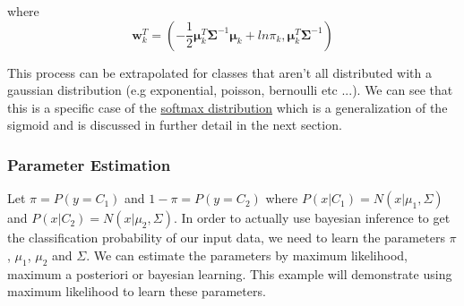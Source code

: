 \documentclass[12pt]{article}
\begin{document}
        where
        $$ \boldsymbol{w}^T_k = (-\frac{1}{2}\boldsymbol{\mu}^T_k \boldsymbol{\Sigma}^{-1} \boldsymbol{\mu}_k + ln\pi_k, \boldsymbol{\mu}_k^T\boldsymbol{\Sigma}^{-1}) $$

        This process can be extrapolated for classes that aren't all distributed with a gaussian distribution (e.g exponential, poisson, bernoulli etc ...). We can see that this is a specific case of the \hyperlink{Softmax Regression}{softmax distribution} which is a generalization of the sigmoid 
        and is discussed in further detail in the next section.

        \subsubsection{Parameter Estimation}
            Let $\pi = P(y = C_1)$ and $1 - \pi=P(y = C_2)$ where $P(x|C_1)=N(x|\mu_1, \Sigma)$ and $P(x|C_2) = N(x|\mu_2, \Sigma)$. In order to actually use bayesian inference to get the classification probability of our input data, we need to learn the parameters $\pi$, $\mu_1$, $\mu_2$ and $\Sigma$. 
            We can estimate the parameters by maximum likelihood, maximum a posteriori or bayesian learning. This example will demonstrate using maximum likelihood to learn these parameters.
\end{document}
